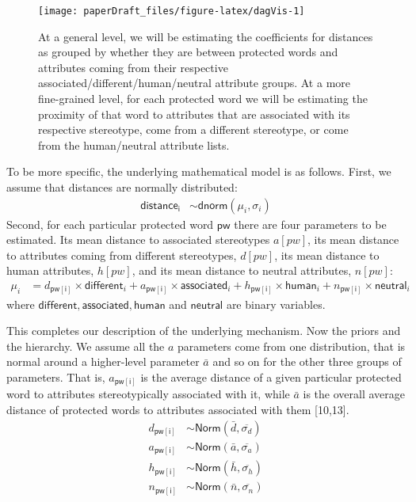 \documentclass[
  12pt,
  dvipsnames,enabledeprecatedfontcommands]{scrartcl}
\begin{document}
\begin{figure}[H]

\begin{center}\texttt{[image: paperDraft\_files/figure-latex/dagVis-1]} \end{center}

\caption{At a general level, we will be estimating the coefficients for distances as grouped by whether they are between protected words and attributes coming from their respective associated/different/human/neutral attribute groups. At a more fine-grained level, for each protected word we will be estimating the proximity of that word to attributes that are associated with its respective stereotype, come from a different stereotype, or come from the human/neutral attribute lists.}
\label{fig:visDag}
\end{figure}

To be more specific, the underlying mathematical model is as follows.
First, we assume that distances are normally distributed:
\begin{align*} \mathsf{distance_i} & \sim \mathsf{dnorm}(\mu_i,\sigma_i)
\end{align*} \noindent Second, for each particular protected word
\(\mathsf{pw}\) there are four parameters to be estimated. Its mean
distance to associated stereotypes \(a[pw]\), its mean distance to
attributes coming from different stereotypes, \(d[pw]\), its mean
distance to human attributes, \(h[pw]\), and its mean distance to
neutral attributes, \(n[pw]\): \begin{align*}
\mu_i & = d_{\mathsf{pw[i]}} \times \mathsf{different}_i  + a_{\mathsf{pw[i]}} \times \mathsf{associated}_i  + h_{\mathsf{pw[i]}} \times \mathsf{human}_i  + n_{\mathsf{pw[i]}}\times \mathsf{neutral}_i
\end{align*} \noindent where
\(\mathsf{different}, \mathsf{associated},\mathsf{human}\) and
\(\mathsf{neutral}\) are binary variables.

This completes our description of the underlying mechanism. Now the
priors and the hierarchy. We assume all the \(a\) parameters come from
one distribution, that is normal around a higher-level parameter
\(\bar{a}\) and so on for the other three groups of parameters. That is,
\(a_{\mathsf{pw[i]}}\) is the average distance of a given particular
protected word to attributes stereotypically associated with it, while
\(\bar{a}\) is the overall average distance of protected words to
attributes associated with them {[}10,13{]}. \begin{align*}
d_{\mathsf{pw[i]}} &\sim \mathsf{Norm}(\bar{d}, \overline{\sigma_d}) \\
a_{\mathsf{pw[i]}} &\sim \mathsf{Norm}(\bar{a}, \overline{\sigma_a}) \\
h_{\mathsf{pw[i]}} &\sim \mathsf{Norm}(\bar{h}, \overline{\sigma_h}) \\
n_{\mathsf{pw[i]}} &\sim \mathsf{Norm}(\bar{n}, \overline{\sigma_n}) 
\end{align*}
\end{document}
